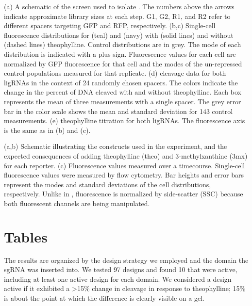 \documentclass[10pt,oneside]{article}
\begin{document}

 (a) A schematic of the screen used to isolate \ligrnaF{}.  The numbers above 
 the arrows indicate approximate library sizes at each step.  G1, G2, R1, and 
 R2 refer to different spacers targeting GFP and RFP, respectively.
 (b,c) Single-cell fluorescence distributions for \ligrnaF{} (teal) and 
 \ligrnaB{} (navy) with (solid lines) and without (dashed lines) theophylline.  
 Control distributions are in grey.  The mode of each distribution is indicated 
 with a plus sign.  Fluorescence values for each cell are normalized by GFP 
 fluorescence for that cell and the modes of the un-repressed control 
 populations measured for that replicate.
 (d) \Invitro{} cleavage data for both ligRNAs in the context of 24 randomly 
 chosen spacers.  The colors indicate the change in the percent of DNA cleaved 
 with and without theophylline.  Each box represents the mean of three 
 measurements with a single spacer.   The grey error bar in the color scale 
 shows the mean and standard deviation for 143 control measurements.
 (e) \Invivo{} theophylline titration for both ligRNAs.  The fluorescence axis 
 is the same as in (b) and (c).
 



 (a,b) Schematic illustrating the constructs used in the experiment, and the 
 expected consequences of adding theophylline (theo) and 3-methylxanthine (3mx) 
 for each reporter.
 (c) Fluorescence values measured over a  timecourse.  Single-cell 
 fluorescence values were measured by flow cytometry.  Bar heights and error 
 bars represent the modes and standard deviations of the cell distributions, 
 respectively.  Unlike in , fluorescence is normalized by 
 side-scatter (SSC) because both fluorescent channels are being manipulated.

\section{Tables}



   The results are organized by 
 the design strategy we employed and the domain the sgRNA was inserted into.  
 We tested 97 designs and found 10 that were active, including at least one 
 active design for each domain.  We considered a design active if it exhibited 
 a >15\% change in cleavage in response to theophylline; 15\% is about the 
 point at which the difference is clearly visible on a gel.
\end{document}
